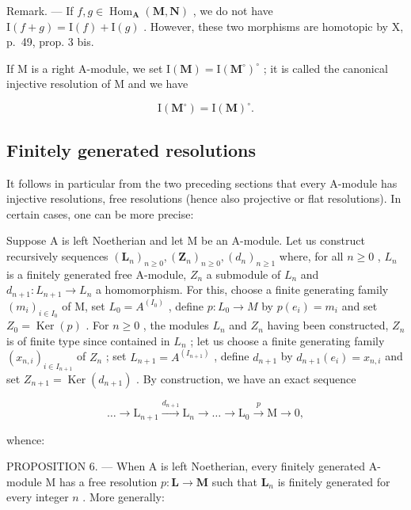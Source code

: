 Remark. --- If \(f, g \in \operatorname{Hom}_{\mathbf{A}}(\mathbf{M}, \mathbf{N})\) , we do not have \(\mathrm{I}(f + g) = \mathrm{I}(f) + \mathrm{I}(g)\) . However, these two morphisms are homotopic by X, p.~49, prop. 3 bis.

If M is a right A-module, we set \(\mathrm{I}(\mathbf{M}) = \mathrm{I}(\mathbf{M}^{\circ})^{\circ}\) ; it is called the canonical injective resolution of M and we have

\[
\mathrm{I} (\mathbf {M} ^ {\circ}) = \mathrm{I} (\mathbf {M}) ^ {\circ}.
\]

\subsection{Finitely generated resolutions}

It follows in particular from the two preceding sections that every A-module has injective resolutions, free resolutions (hence also projective or flat resolutions). In certain cases, one can be more precise:

Suppose A is left Noetherian and let M be an A-module. Let us construct recursively sequences \((\mathbf{L}_{n})_{n\geqslant0},(\mathbf{Z}_{n})_{n\geqslant0},(d_{n})_{n\geqslant1}\) where, for all \(n\geqslant0\) , \(L_{n}\) is a finitely generated free A-module, \(Z_{n}\) a submodule of \(L_{n}\) and \(d_{n+1}:L_{n+1}\to L_{n}\) a homomorphism. For this, choose a finite generating family \((m_{i})_{i\in I_{0}}\) of M, set \(L_{0}=A^{(I_{0})}\) , define \(p:L_{0}\to M\) by \(p(e_{i})=m_{i}\) and set \(Z_{0}=\operatorname{Ker}(p)\) . For \(n\geqslant0\) , the modules \(L_{n}\) and \(Z_{n}\) having been constructed, \(Z_{n}\) is of finite type since contained in \(L_{n}\) ; let us choose a finite generating family \((x_{n,i})_{i\in I_{n+1}}\) of \(Z_{n}\) ; set \(L_{n+1}=A^{(I_{n+1})}\) , define \(d_{n+1}\) by \(d_{n+1}(e_{i})=x_{n,i}\) and set \(Z_{n+1}=\operatorname{Ker}(d_{n+1})\) . By construction, we have an exact sequence

\[
\dots \longrightarrow \mathrm{L} _ {n + 1} \xrightarrow {d _ {n + 1}} \mathrm{L} _ {n} \longrightarrow \dots \longrightarrow \mathrm{L} _ {0} \xrightarrow {p} \mathrm{M} \longrightarrow 0,
\]

whence:

PROPOSITION 6. --- When A is left Noetherian, every finitely generated A-module M has a free resolution \(p: \mathbf{L} \to \mathbf{M}\) such that \(\mathbf{L}_n\) is finitely generated for every integer \(n\) . More generally:

